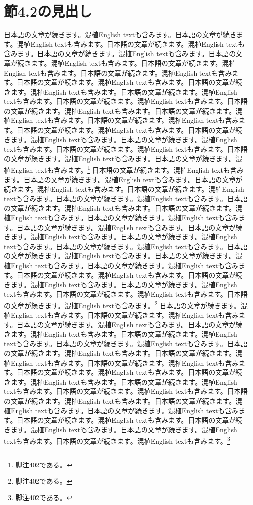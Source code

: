 \documentclass[pdflatex,book]{jlreq}
\begin{document}
\section{節4.2の見出し}
日本語の文章が続きます。混植English textも含みます。日本語の文章が続きます。混植English textも含みます。日本語の文章が続きます。混植English textも含みます。日本語の文章が続きます。混植English textも含みます。日本語の文章が続きます。混植English textも含みます。日本語の文章が続きます。混植English textも含みます。日本語の文章が続きます。混植English textも含みます。日本語の文章が続きます。混植English textも含みます。日本語の文章が続きます。混植English textも含みます。日本語の文章が続きます。混植English textも含みます。日本語の文章が続きます。混植English textも含みます。日本語の文章が続きます。混植English textも含みます。日本語の文章が続きます。混植English textも含みます。日本語の文章が続きます。混植English textも含みます。日本語の文章が続きます。混植English textも含みます。日本語の文章が続きます。混植English textも含みます。日本語の文章が続きます。混植English textも含みます。日本語の文章が続きます。混植English textも含みます。日本語の文章が続きます。混植English textも含みます。日本語の文章が続きます。混植English textも含みます。\footnote{脚注402である。}
日本語の文章が続きます。混植English textも含みます。日本語の文章が続きます。混植English textも含みます。日本語の文章が続きます。混植English textも含みます。日本語の文章が続きます。混植English textも含みます。日本語の文章が続きます。混植English textも含みます。日本語の文章が続きます。混植English textも含みます。日本語の文章が続きます。混植English textも含みます。日本語の文章が続きます。混植English textも含みます。日本語の文章が続きます。混植English textも含みます。日本語の文章が続きます。混植English textも含みます。日本語の文章が続きます。混植English textも含みます。日本語の文章が続きます。混植English textも含みます。日本語の文章が続きます。混植English textも含みます。日本語の文章が続きます。混植English textも含みます。日本語の文章が続きます。混植English textも含みます。日本語の文章が続きます。混植English textも含みます。日本語の文章が続きます。混植English textも含みます。日本語の文章が続きます。混植English textも含みます。日本語の文章が続きます。混植English textも含みます。日本語の文章が続きます。混植English textも含みます。\footnote{脚注402である。}
日本語の文章が続きます。混植English textも含みます。日本語の文章が続きます。混植English textも含みます。日本語の文章が続きます。混植English textも含みます。日本語の文章が続きます。混植English textも含みます。日本語の文章が続きます。混植English textも含みます。日本語の文章が続きます。混植English textも含みます。日本語の文章が続きます。混植English textも含みます。日本語の文章が続きます。混植English textも含みます。日本語の文章が続きます。混植English textも含みます。日本語の文章が続きます。混植English textも含みます。日本語の文章が続きます。混植English textも含みます。日本語の文章が続きます。混植English textも含みます。日本語の文章が続きます。混植English textも含みます。日本語の文章が続きます。混植English textも含みます。日本語の文章が続きます。混植English textも含みます。日本語の文章が続きます。混植English textも含みます。日本語の文章が続きます。混植English textも含みます。日本語の文章が続きます。混植English textも含みます。日本語の文章が続きます。混植English textも含みます。日本語の文章が続きます。混植English textも含みます。\footnote{脚注402である。}
\end{document}
